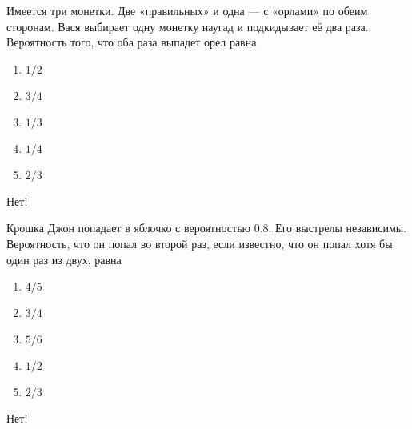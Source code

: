 \documentclass[t]{beamer}
\begin{document}
 \begin{frame} \label{3-No} 
\begin{block}{3} 

Имеется три монетки. Две «правильных» и одна — с «орлами» по обеим сторонам. Вася выбирает одну монетку наугад и подкидывает её два раза. Вероятность того, что оба раза выпадет орел равна
     


 \end{block} 
\begin{enumerate} 
\item[] \hyperlink{3-Yes}{\beamergotobutton{} $1/2$}
\item[] \hyperlink{3-No}{\beamergotobutton{} $3/4$
}
\item[] \hyperlink{3-No}{\beamergotobutton{} $1/3$}
\item[] \hyperlink{3-No}{\beamergotobutton{} $1/4$}
\item[] \hyperlink{3-No}{\beamergotobutton{} $2/3$}
\end{enumerate} 

 \alert{Нет!} 
\end{frame} 


 \begin{frame} \label{4-No} 
\begin{block}{4} 

Крошка Джон попадает в яблочко с вероятностью $0.8$. Его выстрелы независимы. Вероятность, что он попал во второй раз, если известно, что он попал хотя бы один раз из двух, равна


 \end{block} 
\begin{enumerate} 
\item[] \hyperlink{4-No}{\beamergotobutton{} $4/5$}
\item[] \hyperlink{4-No}{\beamergotobutton{} $3/4$}
\item[] \hyperlink{4-Yes}{\beamergotobutton{} $5/6$}
\item[] \hyperlink{4-No}{\beamergotobutton{} $1/2$}
\item[] \hyperlink{4-No}{\beamergotobutton{} $2/3$}
\end{enumerate} 

 \alert{Нет!} 
\end{frame} 
\end{document}
